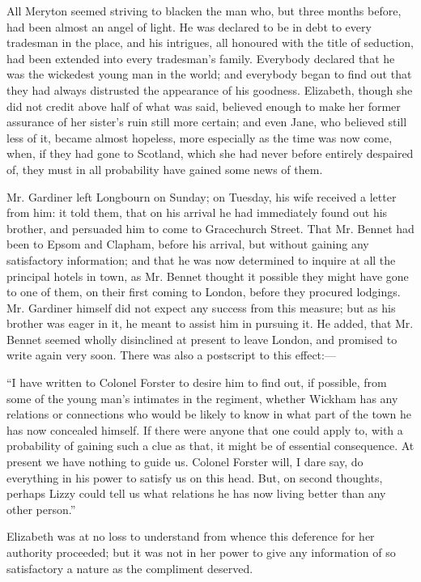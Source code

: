 \documentclass[12pt]{book}
\begin{document}
All Meryton seemed striving to blacken the man who, but three months before, had been almost an angel of light. He was declared to be in debt to every tradesman in the place, and his intrigues, all honoured with the title of seduction, had been extended into every tradesman's family. Everybody declared that he was the wickedest young man in the world; and everybody began to find out that they had always distrusted the appearance of his goodness. Elizabeth, though she did not credit above half of what was said, believed enough to make her former assurance of her sister's ruin still more certain; and even Jane, who believed still less of it, became almost hopeless, more especially as the time was now come, when, if they had gone to Scotland, which she had never before entirely despaired of, they must in all probability have gained some news of them.

Mr. Gardiner left Longbourn on Sunday; on Tuesday, his wife received a letter from him: it told them, that on his arrival he had immediately found out his brother, and persuaded him to come to Gracechurch Street. That Mr. Bennet had been to Epsom and Clapham, before his arrival, but without gaining any satisfactory information; and that he was now determined to inquire at all the principal hotels in town, as Mr. Bennet thought it possible they might have gone to one of them, on their first coming to London, before they procured lodgings. Mr. Gardiner himself did not expect any success from this measure; but as his brother was eager in it, he meant to assist him in pursuing it. He added, that Mr. Bennet seemed wholly disinclined at present to leave London, and promised to write again very soon. There was also a postscript to this effect:---

``I have written to Colonel Forster to desire him to find out, if possible, from some of the young man's intimates in the regiment, whether Wickham has any relations or connections who would be likely to know in what part of the town he has now concealed himself. If there were anyone that one could apply to, with a probability of gaining such a clue as that, it might be of essential consequence. At present we have nothing to guide us. Colonel Forster will, I dare say, do everything in his power to satisfy us on this head. But, on second thoughts, perhaps Lizzy could tell us what relations he has now living better than any other person.''

Elizabeth was at no loss to understand from whence this deference for her authority proceeded; but it was not in her power to give any information of so satisfactory a nature as the compliment deserved.
\end{document}

